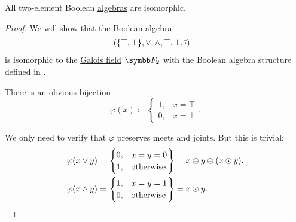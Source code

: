 \begin{proposition}\label{thm:binary_boolean_algebras_are_isomorphic}
  All two-element Boolean \hyperref[def:boolean_algebra]{algebras} are isomorphic.
\end{proposition}
\begin{proof}
  We will show that the Boolean algebra
  \begin{align*}
    &\left( \{ \top, \bot \}, \vee, \wedge, \top, \bot, \overline{\cdot} \right)
  \end{align*}
  is isomorphic to the \hyperref[thm:galois_field_existence]{Galois field} \( \BF_2 \) with the Boolean algebra structure defined in .

  There is an obvious bijection
  \begin{equation*}
    \varphi(x) \coloneqq \begin{cases}
      1, &x = \top \\
      0, &x = \bot
    \end{cases}.
  \end{equation*}

  We only need to verify that \( \varphi \) preserves meets and joints. But this is trivial:
  \begin{align*}
    \varphi(x \vee y)
    &=
    \begin{rcases}
      \begin{cases}
        0, &x = y = 0 \\
        1, &\text{otherwise}
      \end{cases}
    \end{rcases}
    =
    x \oplus y \oplus (x \odot y).
    \\
    \varphi(x \wedge y)
    &=
    \begin{rcases}
      \begin{cases}
        1, &x = y = 1 \\
        0, &\text{otherwise}
      \end{cases}
    \end{rcases}
    =
    x \odot y.
  \end{align*}
\end{proof}
